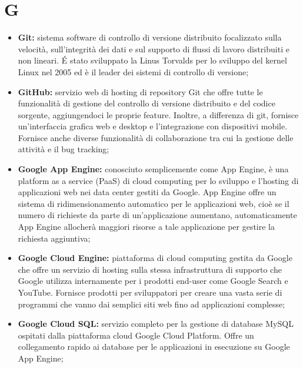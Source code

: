 \section*{G} %
\label{sec:g}
	\begin{itemize}
		\item \textbf{Git:} sistema software di controllo di versione distribuito focalizzato sulla velocità, sull'integrità dei dati e sul supporto di flussi di lavoro distribuiti e non lineari. É stato sviluppato la Linus Torvalds per lo sviluppo del kernel Linux nel 2005 ed è il leader dei sistemi di controllo di versione;
		\item \textbf{GitHub:} servizio web di hosting di repository Git che offre tutte le funzionalità di gestione del controllo di versione distribuito e del codice sorgente, aggiungendoci le proprie feature. Inoltre, a differenza di git, fornisce un'interfaccia grafica web e desktop e l'integrazione con dispositivi mobile. Fornisce anche diverse funzionalità di collaborazione tra cui la gestione delle attività e il bug tracking;
		\item \textbf{Google App Engine:} conosciuto semplicemente come App Engine, è una platform as a service (PaaS) di cloud computing per lo sviluppo e l'hosting di applicazioni web nei data center gestiti da Google. App Engine offre un sistema di ridimensionamento automatico per le applicazioni web, cioè se il numero di richieste da parte di un'applicazione aumentano, automaticamente App Engine allocherà maggiori risorse a tale applicazione per gestire la richiesta aggiuntiva;
		\item \textbf{Google Cloud Engine:} piattaforma di cloud computing gestita da Google che offre un servizio di hosting sulla stessa infrastruttura di supporto che Google utilizza internamente per i prodotti end-user come Google Search e YouTube. Fornisce prodotti per sviluppatori per creare una vasta serie di programmi che vanno dai semplici siti web fino ad applicazioni complesse;
		\item \textbf{Google Cloud SQL:} servizio completo per la gestione di database MySQL ospitati dalla piattaforma cloud Google Cloud Platform. Offre un collegamento rapido ai database per le applicazioni in esecuzione su Google App Engine;
	\end{itemize}
\pagebreak


